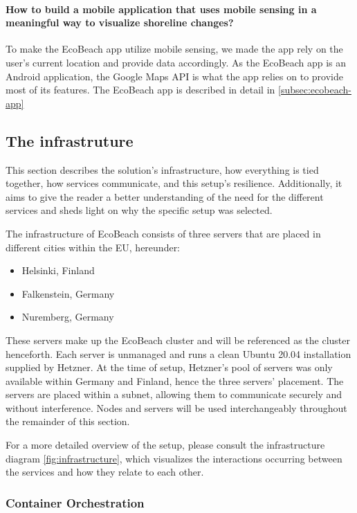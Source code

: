 \paragraph{How to build a mobile application that uses mobile sensing in a meaningful way to visualize shoreline changes?} To make the EcoBeach app utilize mobile sensing, we made the app rely on the user's current location and provide data accordingly. As the EcoBeach app is an Android application, the Google Maps API is what the app relies on to provide most of its features. The EcoBeach app is described in detail in \autoref{subsec:ecobeach-app}

\subsection{The infrastruture}\label{subsec:the-infrastructure}

This section describes the solution's infrastructure, how everything is tied together, how services communicate, and this setup's resilience. Additionally, it aims to give the reader a better understanding of the need for the different services and sheds light on why the specific setup was selected. 

The infrastructure of EcoBeach consists of three servers that are placed in different cities within the EU, hereunder: 

\begin{itemize}
    \item Helsinki, Finland
    \item Falkenstein, Germany
    \item Nuremberg, Germany
\end{itemize}


These servers make up the EcoBeach cluster and will be referenced as the cluster henceforth. Each server is unmanaged and runs a clean Ubuntu 20.04 installation supplied by Hetzner. At the time of setup, Hetzner's pool of servers was only available within Germany and Finland, hence the three servers' placement. The servers are placed within a subnet, allowing them to communicate securely and without interference. 
Nodes and servers will be used interchangeably throughout the remainder of this section. 

For a more detailed overview of the setup, please consult the infrastructure diagram \autoref{fig:infrastructure}, which visualizes the interactions occurring between the services and how they relate to each other.

\subsubsection{Container Orchestration}

